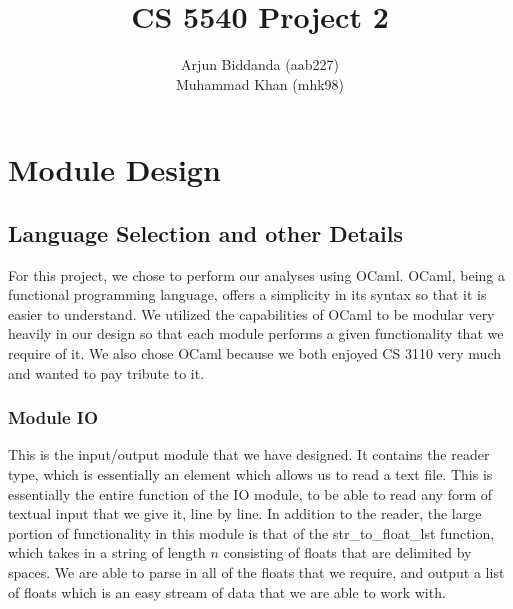 \documentclass[11pt]{article} %
\title{CS 5540 Project 2}
\author{Arjun Biddanda (aab227) \\
Muhammad Khan (mhk98)}
\begin{document}
\maketitle

\section{Module Design}
\subsection{Language Selection and other Details}
For this project, we chose to perform our analyses using OCaml. OCaml, being a functional programming language, offers a simplicity in its syntax so that it is easier to understand. We utilized the capabilities of OCaml to be modular very heavily in our design so that each module performs a given functionality that we require of it. We also chose OCaml because we both enjoyed CS 3110 very much and wanted to pay tribute to it. 

\subsubsection{Module IO}
This is the input/output module that we have designed. It contains the reader type, which is essentially an element which allows us to read a text file. This is essentially the entire function of the IO module, to be able to read any form of textual input that we give it, line by line. 
In addition to the reader, the large portion of functionality in this module is that of the str\_to\_float\_lst function, which takes in a string of length $n$ consisting of floats that are delimited by spaces. We are able to parse in all of the floats that we require, and output a list of floats which is an easy stream of data that we are able to work with. 
\end{document}
